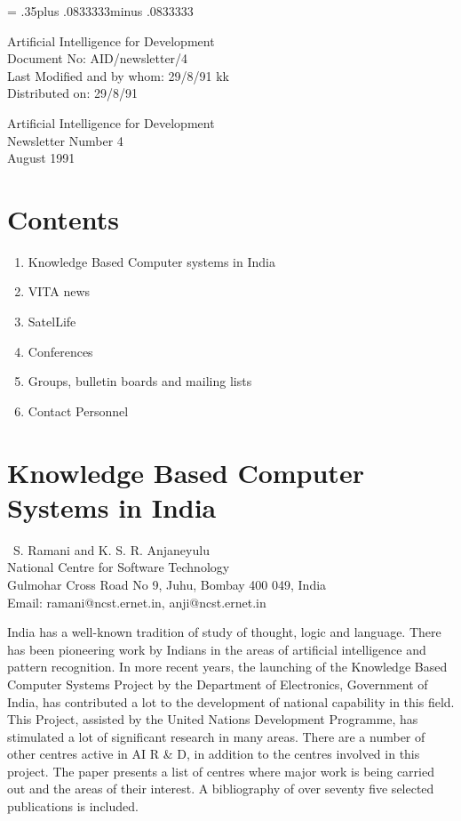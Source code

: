 \pagestyle{myheadings}
\setlength{\textheight}{9in}
\setlength{\topmargin}{0in}
\setlength{\headheight}{.3in}
\setlength{\headsep}{.5in}
\parindent=0pt
\parskip= .35\baselineskip plus .0833333\baselineskip minus .0833333\baselineskip

Artificial Intelligence for Development\\
Document No: AID/newsletter/4\\
Last Modified and by whom: 29/8/91 kk \\
Distributed on: 29/8/91\\
\LARGE
\begin{center} Artificial Intelligence for Development\\
Newsletter Number 4\\August 1991\\

\end{center}
\normalsize
\section*{Contents}
\begin{enumerate}
\item Knowledge Based Computer systems in India
\item VITA news
\item SatelLife
\item Conferences
\item Groups, bulletin boards and mailing lists
\item Contact Personnel
\end{enumerate} 

\section{Knowledge Based Computer Systems in India}

{\ S. Ramani and K. S. R. Anjaneyulu\\} 
{National Centre for Software Technology\\
Gulmohar Cross Road No 9, Juhu, Bombay 400 049, India\\ 
Email: ramani@ncst.ernet.in, anji@ncst.ernet.in}

India has a well-known tradition of study of thought, logic 
and language. There has been pioneering work by Indians in the areas of
artificial intelligence and pattern recognition. In more recent years, 
the launching of the Knowledge Based Computer Systems Project by the Department 
of Electronics, Government of India, has contributed a lot to the 
development of national capability in this field. This Project, 
assisted by the United Nations Development Programme, 
has stimulated a lot of significant 
research in many areas.  There are a number of other centres active
in AI R \& D, in addition to the centres involved in this
project.  The paper presents a list of centres where 
major work is being carried out and the areas of their interest.
A bibliography of over seventy five selected publications is included. 

